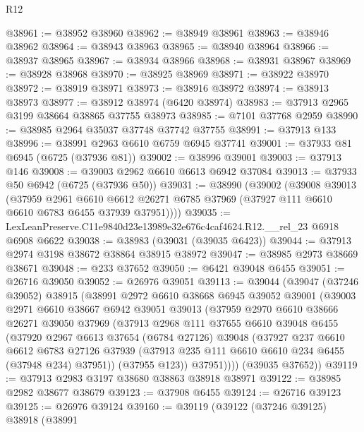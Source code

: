 \begin{lexlean}{R12}
\begin{coremodule}
@38961 := @38952 @38960
@38962 := @38949 @38961
@38963 := @38946 @38962
@38964 := @38943 @38963
@38965 := @38940 @38964
@38966 := @38937 @38965
@38967 := @38934 @38966
@38968 := @38931 @38967
@38969 := @38928 @38968
@38970 := @38925 @38969
@38971 := @38922 @38970
@38972 := @38919 @38971
@38973 := @38916 @38972
@38974 := @38913 @38973
@38977 := @38912 @38974 (@6420 @38974)
@38983 := @37913 @2965 @3199 @38664 @38865 @37755 @38973
@38985 := @7101 @37768 @2959
@38990 := @38985 @2964 @35037 @37748 @37742 @37755
@38991 := @37913 @133
@38996 := @38991 @2963 @6610 @6759 @6945 @37741
@39001 := @37933 @81 @6945 (@6725 (@37936 @81))
@39002 := @38996 @39001
@39003 := @37913 @146
@39008 := @39003 @2962 @6610 @6613 @6942 @37084
@39013 := @37933 @50 @6942 (@6725 (@37936 @50))
@39031 := @38990
    (@39002
      (@39008
        @39013
        (@37959
          @2961
          @6610
          @6612
          @26271
          @6785
          @37969
          (@37927 @111 @6610 @6610 @6783 @6455 @37939 @37951))))
@39035 := LexLeanPreserve.C11e9840d23e13989e32e676c4caf4624.R12.__rel_23 @6918 @6908 @6622
@39038 := @38983 (@39031 (@39035 @6423))
@39044 := @37913 @2974 @3198 @38672 @38864 @38915 @38972
@39047 := @38985 @2973 @38669 @38671
@39048 := @233 @37652
@39050 := @6421 @39048 @6455
@39051 := @26716 @39050
@39052 := @26976 @39051
@39113 := @39044
    (@39047
      (@37246 @39052)
      @38915
      (@38991
        @2972
        @6610
        @38668
        @6945
        @39052
        @39001
        (@39003
          @2971
          @6610
          @38667
          @6942
          @39051
          @39013
          (@37959
            @2970
            @6610
            @38666
            @26271
            @39050
            @37969
            (@37913
              @2968
              @111
              @37655
              @6610
              @39048
              @6455
              (@37920
                @2967
                @6613
                @37654
                (@6784 @27126)
                @39048
                (@37927
                  @237
                  @6610
                  @6612
                  @6783
                  @27126
                  @37939
                  (@37913 @235 @111 @6610 @6610 @234 @6455 (@37948 @234) @37951))
                (@37955 @123))
              @37951))))
      (@39035 @37652))
@39119 := @37913 @2983 @3197 @38680 @38863 @38918 @38971
@39122 := @38985 @2982 @38677 @38679
@39123 := @37908 @6455
@39124 := @26716 @39123
@39125 := @26976 @39124
@39160 := @39119
    (@39122
      (@37246 @39125)
      @38918
      (@38991

\end{coremodule}
\end{lexlean}
